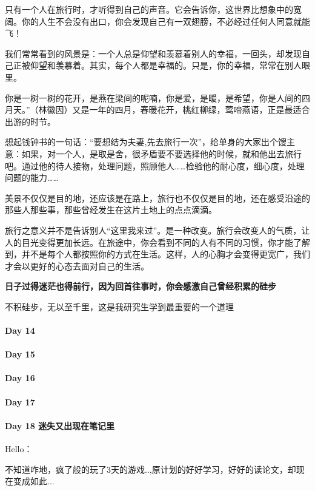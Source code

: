 \documentclass[UTF8,a4paper,8pt]{ctexbook}
\begin{document}
	 	 只有一个人在旅行时，才听得到自己的声音。它会告诉你，这世界比想象中的宽阔。你的人生不会没有出口，你会发现自己有一双翅膀，不必经过任何人同意就能飞！
	 	 
	 	 我们常常看到的风景是：一个人总是仰望和羡慕着别人的幸福，一回头，却发现自己正被仰望和羡慕着。其实，每个人都是幸福的。只是，你的幸福，常常在别人眼里。
	 	 
	 	 你是一树一树的花开，是燕在梁间的呢喃，你是爱，是暖，是希望，你是人间的四月天。”（林徽因）又是一年的四月，春暖花开，桃红柳绿，莺啼燕语，正是最适合出游的时节。
	 	 
	 	 想起钱钟书的一句话：“要想结为夫妻,先去旅行一次”，给单身的大家出个馊主意：如果，对一个人，是取是舍，很矛盾要不要选择他的时候，就和他出去旅行吧。通过他的待人接物，处理问题，照顾他人……检验他的耐心度，细心度，处理问题的能力……
	 	 
	 	 美景不仅仅是目的地，还应该是在路上，旅行也不仅仅是目的地，还在感受沿途的那些人那些事，那些曾经发生在这片土地上的点点滴滴。
	 	 
	 	 旅行之意义并不是告诉别人“这里我来过”。是一种改变。旅行会改变人的气质，让人的目光变得更加长远。在旅途中，你会看到不同的人有不同的习惯，你才能了解到，并不是每个人都按照你的方式在生活。这样，人的心胸才会变得更宽广，我们才会以更好的心态去面对自己的生活。
	 	 
	 	 
	 	 \textbf{日子过得迷茫也得前行，因为回首往事时，你会感激自己曾经积累的硅步}
	 	 
	 	 不积硅步，无以至千里，这是我研究生学到最重要的一个道理
 	 \paragraph{Day 14      \quad     }
 	 \paragraph{Day 15      \quad     }
 	 \paragraph{Day 16      \quad     }
 	 \paragraph{Day 17      \quad     }
 	 \paragraph{Day 18  迷失又出现在笔记里    \quad     }
	 	 Hello：
	 	 
	 	 不知道咋地，疯了般的玩了3天的游戏..,原计划的好好学习，好好的读论文，却现在变成如此...
	 	 
\end{document}
